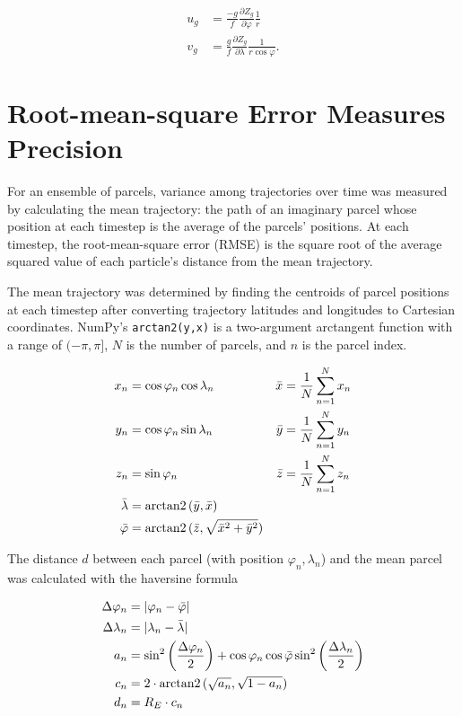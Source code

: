 \begin{align}
    u_g &= \frac{-g}{f} \frac{\partial Z_g}{\partial \varphi} \frac{1}{r} \label{eq:u_g} \\
    v_g &= \frac{g}{f} \frac{\partial Z_g}{\partial \lambda} \frac{1}{r \cos{\varphi}}. \label{eq:v_g}
\end{align}

\section{Root-mean-square Error Measures Precision}
For an ensemble of parcels, variance among trajectories over time was measured by calculating the mean trajectory: the path of an imaginary parcel whose position at each timestep is the average of the parcels' positions.
At each timestep, the root-mean-square error (RMSE) is the square root of the average squared value of each particle's distance from the mean trajectory.

The mean trajectory was determined by finding the centroids of parcel positions at each timestep after converting trajectory latitudes and longitudes to Cartesian coordinates. 
NumPy's \texttt{arctan2(y,x)} is a two-argument arctangent function with a range of $(-\pi, \pi]$, $N$ is the number of parcels, and $n$ is the parcel index.

\begin{align}
    x_n &= \cos \varphi_n \cos \lambda_n & \bar{x} &= \frac{1}{N} \sum_{n = 1}^{N} x_n \\
    y_n &= \cos \varphi_n \sin \lambda_n & \bar{y} &= \frac{1}{N} \sum_{n = 1}^{N} y_n \\
    z_n &= \sin \varphi_n & \bar{z} &= \frac{1}{N} \sum_{n = 1}^{N} z_n \\
    \bar{\lambda} &= \operatorname{arctan2}{(\bar{y},\bar{x})} \\
    \bar{\varphi} &= \operatorname{arctan2}{(\bar{z}, \sqrt{\bar{x}^2 + \bar{y}^2})}
\end{align}

The distance $d$ between each parcel (with position $\varphi_n, \lambda_n$) and the mean parcel was calculated with the haversine formula

\begin{align}
    \Delta \varphi_n &= | \varphi_n - \bar{\varphi}| \label{eq:delta_lat} \\
    \Delta \lambda_n &= |\lambda_n - \bar{\lambda}| \label{eq:delta_lon} \\
    a_n &= \sin^2 \left ( \frac{\Delta \varphi_n}{2} \right ) + \cos{\varphi_n}  \cos{\bar{\varphi}} \sin^2 \left ( \frac{\Delta \lambda_n}{2} \right ) \\
    c_n &= 2 \cdot \operatorname{arctan2}{(\sqrt{a_n}, \sqrt{1 - a_n})} \\
    d_n &= R_E \cdot c_n
\end{align}


